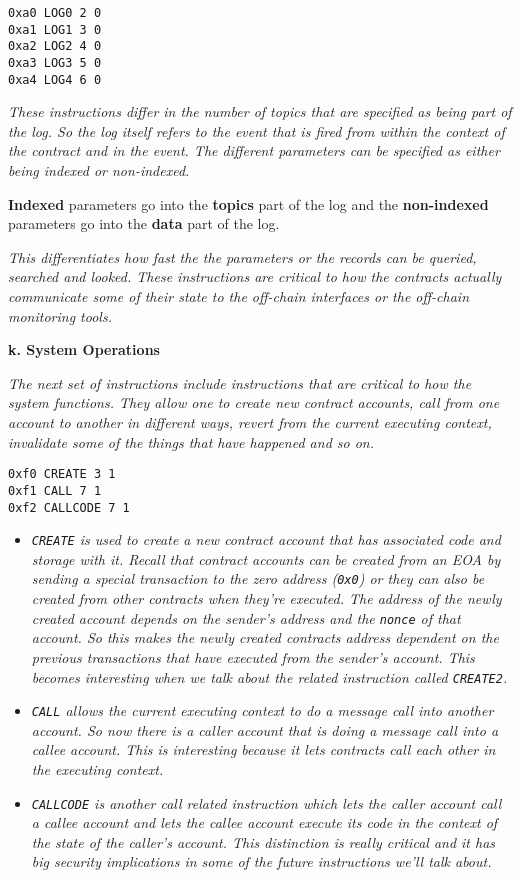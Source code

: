 \begin{lstlisting}[language=Solidity,numbers=none]
0xa0 LOG0 2 0
0xa1 LOG1 3 0
0xa2 LOG2 4 0
0xa3 LOG3 5 0
0xa4 LOG4 6 0
\end{lstlisting}

\emph{These instructions differ in the number of topics that are
specified as being part of the log. So the log itself refers to the
event that is fired from within the context of the contract and in the
event. The different parameters can be specified as either being indexed
or non-indexed.}

\textbf{Indexed} parameters go into the \textbf{topics} part of the log
and the \textbf{non-indexed} parameters go into the \textbf{data} part
of the log.

\emph{This differentiates how fast the the parameters or the records can
be queried, searched and looked. These instructions are critical to how
the contracts actually communicate some of their state to the off-chain
interfaces or the off-chain monitoring tools.}

\hfill\break
\textbf{k. System Operations}

\emph{The next set of instructions include instructions that are
critical to how the system functions. They allow one to create new
contract accounts, call from one account to another in different ways,
revert from the current executing context, invalidate some of the things
that have happened and so on.}

\begin{lstlisting}[language=Solidity,numbers=none]
0xf0 CREATE 3 1
0xf1 CALL 7 1
0xf2 CALLCODE 7 1
\end{lstlisting}

\begin{itemize}
\tightlist
\item
  \emph{\texttt{CREATE} is used to create a new contract account that
  has associated code and storage with it. Recall that contract accounts
  can be created from an EOA by sending a special transaction to the
  zero address (\texttt{0x0}) or they can also be created from other
  contracts when they're executed. The address of the newly created
  account depends on the sender's address and the \texttt{nonce} of that
  account. So this makes the newly created contracts address dependent
  on the previous transactions that have executed from the sender's
  account. This becomes interesting when we talk about the related
  instruction called \texttt{CREATE2}.}
\item
  \emph{\texttt{CALL} allows the current executing context to do a
  message call into another account. So now there is a caller account
  that is doing a message call into a callee account. This is
  interesting because it lets contracts call each other in the executing
  context.}
\item
  \emph{\texttt{CALLCODE} is another call related instruction which lets
  the caller account call a callee account and lets the callee account
  execute its code in the context of the state of the caller's account.
  This distinction is really critical and it has big security
  implications in some of the future instructions we'll talk about.}
\end{itemize}

